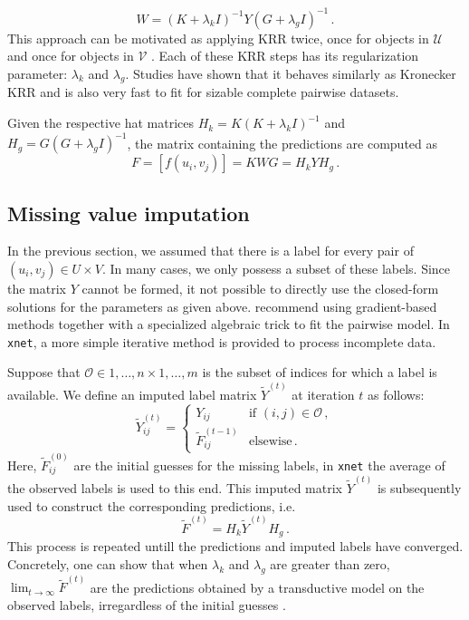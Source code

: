 \documentclass[
]{article}
\begin{document}
\[
W = (K+\lambda_k I)^{-1}Y(G+\lambda_g I)^{-1}\,.
\] This approach can be motivated as applying KRR twice, once for
objects in \(\mathcal{U}\) and once for objects in \(\mathcal{V}\)
\citep{Pahikkala2014a, Romera-paredes2015}. Each of these KRR steps has
its regularization parameter: \(\lambda_k\) and \(\lambda_g\). Studies
have shown that it behaves similarly as Kronecker KRR
\citep{Stock2017tskrr} and is also very fast to fit for sizable complete
pairwise datasets.

Given the respective hat matrices \(H_k = K(K+\lambda_k I )^{-1}\) and
\(H_g = G(G+\lambda_g I )^{-1}\), the matrix containing the predictions
are computed as \[
F = [f(u_i, v_j)] = KWG =H_kYH_g\,.
\]

\hypertarget{missing-value-imputation}{%
\subsection{Missing value imputation}\label{missing-value-imputation}}

In the previous section, we assumed that there is a label for every pair
of \((u_i,v_j)\in U \times V\). In many cases, we only possess a subset
of these labels. Since the matrix \(Y\) cannot be formed, it not
possible to directly use the closed-form solutions for the parameters as
given above. \citet{Airola2017genvectric} recommend using gradient-based
methods together with a specialized algebraic trick to fit the pairwise
model. In \texttt{xnet}, a more simple iterative method is provided to
process incomplete data.

Suppose that \(\mathcal{O}\in 1,\ldots, n \times 1,\ldots, m\) is the
subset of indices for which a label is available. We define an imputed
label matrix \(\tilde{Y}^{(t)}\) at iteration \(t\) as follows: \[
\tilde{Y}_{ij}^{(t)}={\begin{cases} Y_{ij} & \text{if } (i,j)\in \mathcal{O}\,,\\ \tilde{F}_{ij}^{(t-1)} & \text{elsewise}\,.\end{cases}}
\] Here, \(\tilde{F}_{ij}^{(0)}\) are the initial guesses for the
missing labels, in \texttt{xnet} the average of the observed labels is
used to this end. This imputed matrix \(\tilde{Y}^{(t)}\) is
subsequently used to construct the corresponding predictions, i.e. \[
\tilde{F}^{(t)} = H_k \tilde{Y}^{(t)} H_g\,.
\] This process is repeated untill the predictions and imputed labels
have converged. Concretely, one can show that when \(\lambda_k\) and
\(\lambda_g\) are greater than zero,
\(\lim_{t\rightarrow \infty}\tilde{F}^{(t)}\) are the predictions
obtained by a transductive model on the observed labels, irregardless of
the initial guesses \citep{Stock2017phd}.
\end{document}
